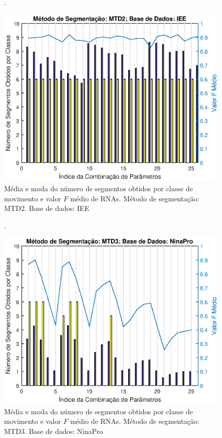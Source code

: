 \begin{figure}[htb]
	\caption{\label{fig:mtd2Iee}Média e moda do número de segmentos obtidos por classe de movimento e valor $F$ médio de RNAs. Método de segmentação: MTD2. Base de dados: IEE}.
	\begin{center}
	    \includegraphics[width=0.75\linewidth]{./img/matlab/results/mtd2_iee.eps}
	\end{center}
\end{figure}

\begin{figure}[htb]
	\caption{\label{fig:mtd3Nina}Média e moda do número de segmentos obtidos por classe de movimento e valor $F$ médio de RNAs. Método de segmentação: MTD3. Base de dados: NinaPro}.
	\begin{center}
	    \includegraphics[width=0.75\linewidth]{./img/matlab/results/mtd3_nina.eps}
	\end{center}
\end{figure}

